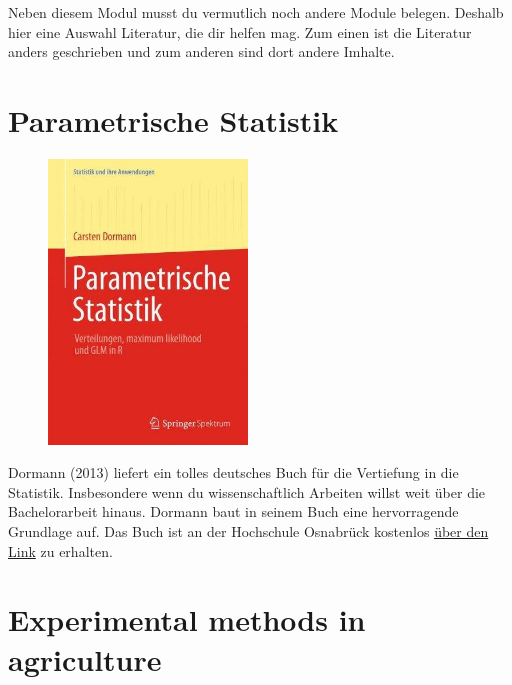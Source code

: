 \documentclass[
  letterpaper,
  DIV=11,
  oneside]{scrreport}
\begin{document}
Neben diesem Modul musst du vermutlich noch andere Module belegen.
Deshalb hier eine Auswahl Literatur, die dir helfen mag. Zum einen ist
die Literatur anders geschrieben und zum anderen sind dort andere
Imhalte.

\hypertarget{parametrische-statistik}{%
\section{Parametrische Statistik}\label{parametrische-statistik}}

\begin{figure}

{\centering \includegraphics[width=2.08333in,height=\textheight]{./images/dormann.jpg}

}

\end{figure}

Dormann (2013) liefert ein tolles deutsches Buch für die Vertiefung in
die Statistik. Insbesondere wenn du wissenschaftlich Arbeiten willst
weit über die Bachelorarbeit hinaus. Dormann baut in seinem Buch eine
hervorragende Grundlage auf. Das Buch ist an der Hochschule Osnabrück
kostenlos
\href{https://link.springer.com/book/10.1007/978-3-662-54684-0}{über den
Link} zu erhalten.

\hypertarget{experimental-methods-in-agriculture}{%
\section{Experimental methods in
agriculture}\label{experimental-methods-in-agriculture}}
\end{document}
